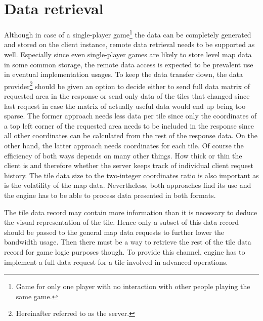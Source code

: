 \documentclass[11pt,oneside, final]{fithesis2}
\begin{document}
\section{Data retrieval}
\label{datadesign}
Although in case of a single-player game\footnote{Game for only one player with no interaction with other people playing the same game.} the data can be completely generated and stored on the client instance, remote data retrieval needs to be supported as well. Especially since even single-player games are likely to store level map data in some common storage, the remote data access is expected to be prevalent use in eventual implementation usages. To keep the data transfer down, the data provider\footnote{Hereinafter referred to as the server.} should be given an option to decide either to send full data matrix of requested area in the response or send only data of the tiles that changed since last request in case the matrix of actually useful data would end up being too sparse. The former approach needs less data per tile since only the coordinates of a top left corner of the requested area needs to be included in the response since all other coordinates can be calculated from the rest of the response data. On the other hand, the latter approach needs coordinates for each tile. Of course the efficiency of both ways depends on many other things. How thick or thin the client is and therefore whether the server keeps track of individual client request history. The tile data size to the two-integer coordinates ratio is also important as is the volatility of the map data. Nevertheless, both approaches find its use and the engine has to be able to process data presented in both formats.

The tile data record may contain more information than it is necessary to deduce the visual representation of the tile. Hence only a subset of this data record should be passed to the general map data requests to further lower the bandwidth usage. Then there must be a way to retrieve the rest of the tile data record for game logic purposes though. To provide this channel, engine has to implement a full data request for a tile involved in advanced operations.
\end{document}

